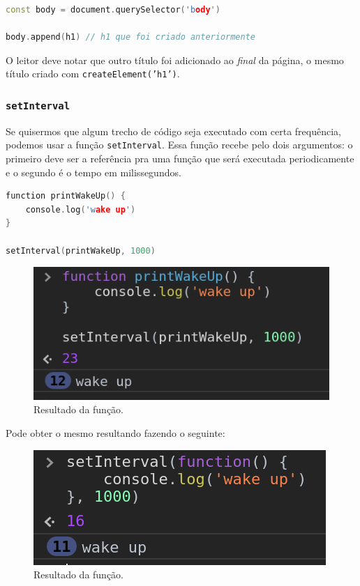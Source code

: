 \begin{lstlisting}[language=C++]
const body = document.querySelector('body')

body.append(h1) // h1 que foi criado anteriormente

\end{lstlisting}
\hfill

O leitor deve notar que outro título foi adicionado ao \textit{final} da página, o mesmo título criado com \texttt{createElement('h1')}.


\subsubsection{\texttt{setInterval} }
Se quisermos que algum trecho de código seja executado com  certa frequência, podemos usar a função \texttt{setInterval}. Essa função recebe pelo dois argumentos: o primeiro deve ser a referência pra uma função que será executada periodicamente e o segundo é o tempo em milissegundos. \\

\begin{lstlisting}[language=C++]
function printWakeUp() {
    console.log('wake up')
}

setInterval(printWakeUp, 1000)
\end{lstlisting}
\hfill


\begin{figure}[h!]
    \centering
    \includegraphics[scale=.5]{imgs/setInterval-wakeUp.png}
    \caption{ Resultado da função. }
    \label{fig:setInterval-wakeUp}
\end{figure}

Pode obter o mesmo resultando fazendo o seguinte:

\begin{figure}[h!]
    \centering
    \includegraphics[scale=.5]{imgs/setInterval-anon-function.png}
    \caption{ Resultado da função. }
    \label{fig:setInterval-anon-function}
\end{figure}


